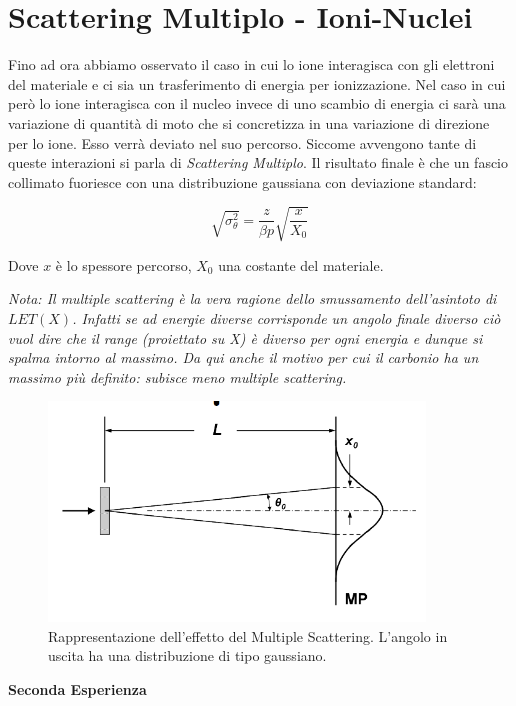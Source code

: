 \section{Scattering Multiplo - Ioni-Nuclei}

Fino ad ora abbiamo osservato il caso in cui lo ione interagisca con gli elettroni del materiale e ci sia un trasferimento di energia per ionizzazione.
Nel caso in cui però lo ione interagisca con il nucleo invece di uno scambio di energia ci sarà una variazione di quantità di moto che si concretizza in una variazione di direzione per lo ione. Esso verrà deviato nel suo percorso. Siccome avvengono tante di queste interazioni si parla di \emph{Scattering Multiplo}. 
Il risultato finale è che un fascio collimato fuoriesce con una distribuzione gaussiana con deviazione standard:

\begin{equation}
\sqrt{\sigma_{\theta}^2}=\frac{z}{\beta p}\sqrt{\frac{x}{X_0}}
\end{equation}

Dove $x$ è lo spessore percorso, $X_0$ una costante del materiale.

\emph{Nota: Il multiple scattering è la vera ragione dello smussamento dell'asintoto di $LET(X)$. Infatti se ad energie diverse corrisponde un angolo finale diverso ciò vuol dire che il range (proiettato su X) è diverso per ogni energia e dunque si spalma intorno al massimo. Da qui anche il motivo per cui il carbonio ha un massimo più definito: subisce meno multiple scattering.}

\begin{figure}
\centering
	\includegraphics[width=10cm, keepaspectratio]{figs/multiplescattering.png}
	\caption{Rappresentazione dell'effetto del Multiple Scattering. L'angolo in uscita ha una distribuzione di tipo gaussiano.}
	\label{multiplescattering}
\end{figure}

\textbf{Seconda Esperienza}

